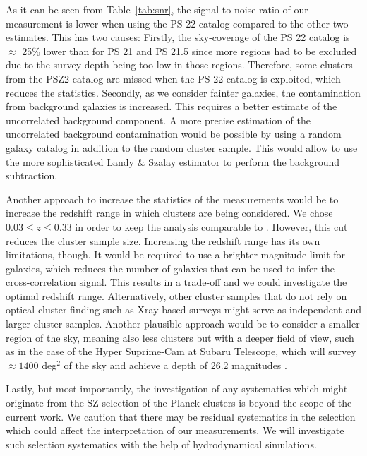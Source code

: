 \documentclass[iop, apjl, twocolappendix, numberedappendix]{emulateapj}
\begin{document}
As it can be seen from Table~\ref{tab:snr}, the signal-to-noise
ratio of our measurement is lower when using the PS 22 catalog
compared to the other two estimates. This has two causes: Firstly,
the sky-coverage of the PS 22 catalog is $\approx$ 25\% lower than
for PS 21 and PS 21.5 since more regions had to be excluded due to
the survey depth being too low in those regions. Therefore, some
clusters from the PSZ2 catalog are missed when the PS 22 catalog is
exploited, which reduces the statistics. Secondly, as we consider
fainter galaxies, the contamination from background galaxies is
increased. This requires a better estimate of the uncorrelated
background component. A more precise estimation of the uncorrelated
background contamination would be possible by using a random galaxy
catalog in addition to the random cluster sample. This would allow
to use the more sophisticated Landy \& Szalay estimator
\citep{landy1993bias} to perform the background subtraction.

Another approach to increase the statistics of the measurements would be to increase the redshift range in which clusters are being considered. We chose $0.03 \leq z \leq 0.33$ in order to keep the analysis comparable to \citet{more2016detection}. However, this cut reduces the cluster sample size. Increasing the redshift range has its own limitations, though. It would be required to use a brighter magnitude limit for galaxies, which reduces the number of galaxies that can be used to infer the cross-correlation signal. This results in a trade-off and we could investigate the optimal redshift range. Alternatively, other cluster samples that do not rely on optical cluster finding such as Xray based surveys might serve as independent and larger cluster samples. 
Another plausible approach would be to consider a smaller region of
the sky, meaning also less clusters but with a deeper field of view,
such as in the case of the Hyper Suprime-Cam at Subaru Telescope,
which will survey $\approx 1400$ deg$^2$ of the sky and achieve a
depth of 26.2 magnitudes \citep{takada2010subaru}.

Lastly, but most importantly, the investigation of any systematics
which might originate from the SZ selection of the Planck clusters
is beyond the scope of the current work. We caution that there may
be residual systematics in the selection which could affect the
interpretation of our measurements. We will investigate such
selection systematics with the help of hydrodynamical simulations.
\end{document}
